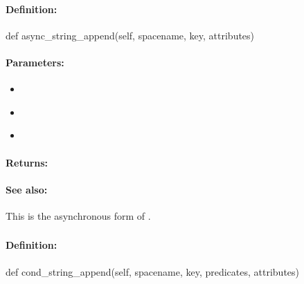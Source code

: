 \paragraph{Definition:}
\begin{pythoncode}
def async_string_append(self, spacename, key, attributes)
\end{pythoncode}

\paragraph{Parameters:}
\begin{itemize}[noitemsep]
\item {}\\

\item {}\\

\item {}\\

\end{itemize}

\paragraph{Returns:}


\paragraph{See also:}  This is the asynchronous form of .

\pagebreak
\subsubsection{}
\label{api:python:cond_string_append}


\paragraph{Definition:}
\begin{pythoncode}
def cond_string_append(self, spacename, key, predicates, attributes)
\end{pythoncode}

